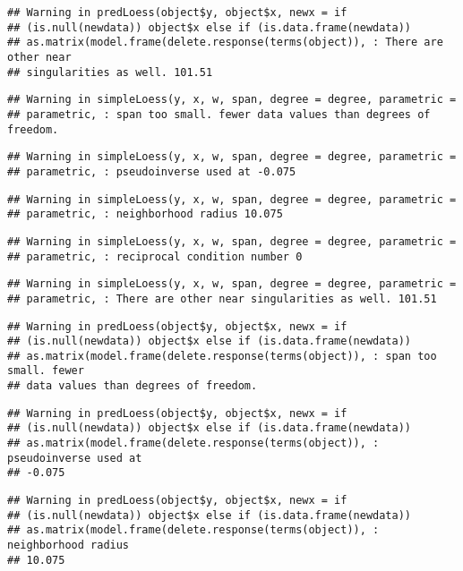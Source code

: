 \documentclass[
]{article}
\begin{document}
\begin{verbatim}
## Warning in predLoess(object$y, object$x, newx = if
## (is.null(newdata)) object$x else if (is.data.frame(newdata))
## as.matrix(model.frame(delete.response(terms(object)), : There are other near
## singularities as well. 101.51
\end{verbatim}

\begin{verbatim}
## Warning in simpleLoess(y, x, w, span, degree = degree, parametric =
## parametric, : span too small. fewer data values than degrees of freedom.
\end{verbatim}

\begin{verbatim}
## Warning in simpleLoess(y, x, w, span, degree = degree, parametric =
## parametric, : pseudoinverse used at -0.075
\end{verbatim}

\begin{verbatim}
## Warning in simpleLoess(y, x, w, span, degree = degree, parametric =
## parametric, : neighborhood radius 10.075
\end{verbatim}

\begin{verbatim}
## Warning in simpleLoess(y, x, w, span, degree = degree, parametric =
## parametric, : reciprocal condition number 0
\end{verbatim}

\begin{verbatim}
## Warning in simpleLoess(y, x, w, span, degree = degree, parametric =
## parametric, : There are other near singularities as well. 101.51
\end{verbatim}

\begin{verbatim}
## Warning in predLoess(object$y, object$x, newx = if
## (is.null(newdata)) object$x else if (is.data.frame(newdata))
## as.matrix(model.frame(delete.response(terms(object)), : span too small. fewer
## data values than degrees of freedom.
\end{verbatim}

\begin{verbatim}
## Warning in predLoess(object$y, object$x, newx = if
## (is.null(newdata)) object$x else if (is.data.frame(newdata))
## as.matrix(model.frame(delete.response(terms(object)), : pseudoinverse used at
## -0.075
\end{verbatim}

\begin{verbatim}
## Warning in predLoess(object$y, object$x, newx = if
## (is.null(newdata)) object$x else if (is.data.frame(newdata))
## as.matrix(model.frame(delete.response(terms(object)), : neighborhood radius
## 10.075
\end{verbatim}
\end{document}

